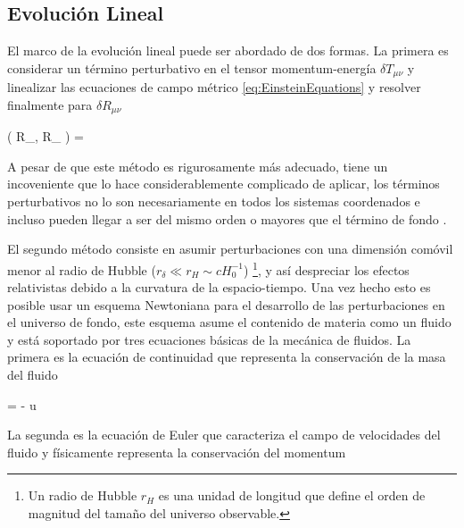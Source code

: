 	\subsection{Evolución Lineal}
	\label{subsec:LinearEvolution}


El marco de la evolución lineal puede ser abordado de dos formas. La primera
es considerar un término perturbativo en el tensor momentum-energía 
$ \delta T_{\mu \nu}$ y linealizar las ecuaciones de campo métrico 
\ref{eq:EinsteinEquations} y resolver finalmente para $\delta R_{\mu \nu}$


{ ( R_{\mu \nu}, \delta R_{\mu \nu} ) = 
 }


A pesar de que este método es rigurosamente más adecuado, tiene un 
incoveniente que lo hace considerablemente complicado de aplicar, los 
términos perturbativos no lo son necesariamente en todos los sistemas 
coordenados e incluso pueden llegar a ser del mismo orden o mayores que el 
término de fondo \cite{padmanabhan1995}.


El segundo método consiste en asumir perturbaciones con una dimensión 
comóvil menor al radio de Hubble ($r_\delta \ll r_H \sim cH_0^{-1}$) 
\footnote{Un radio de Hubble $r_H$ es una unidad de longitud que define 
el orden de magnitud del tamaño del universo observable.}, y así 
despreciar los efectos relativistas debido a la curvatura de la 
espacio-tiempo. Una vez hecho esto es posible usar un esquema Newtoniana 
para el desarrollo de las perturbaciones en el universo de fondo, este 
esquema asume el contenido de materia como un fluido y está soportado por 
tres ecuaciones básicas de la mecánica de fluidos. La primera es la 
ecuación de continuidad que representa la conservación de la masa del 
fluido


{  = - \rho \nabla \cdot \bds u }


La segunda es la ecuación de Euler que caracteriza el campo de velocidades
del fluido y físicamente representa la conservación del momentum


